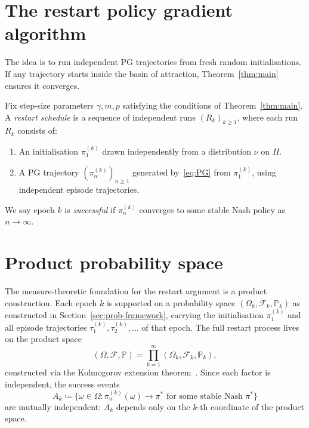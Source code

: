 \documentclass[a4paper,oneside,11pt]{report}
\newcommand{\Prob}{\mathbb{P}}
\newcommand{\calF}{\mathcal{F}}
\numberwithin{theorem}{chapter}
\numberwithin{equation}{chapter}
\begin{document}
\section{The restart policy gradient algorithm}
\label{sec:restart-alg}

The idea is to run independent PG trajectories from fresh random
initialisations. If any trajectory starts inside the basin of
attraction, Theorem~\ref{thm:main} ensures it converges.

\begin{definition}[Restart-PG]
  \label{def:restart-PG}
  Fix step-size parameters $\gamma, m, p$ satisfying the conditions of
  Theorem~\ref{thm:main}. A \emph{restart schedule} is a sequence of
  independent runs $(R_k)_{k \ge 1}$, where each run~$R_k$ consists of:
  \begin{enumerate}
  \item An initialisation $\pi_1^{(k)}$ drawn independently from a
    distribution $\nu$ on $\Pi$.
  \item A PG trajectory $(\pi_n^{(k)})_{n \ge 1}$ generated
    by~\eqref{eq:PG} from $\pi_1^{(k)}$, using independent episode
    trajectories.
  \end{enumerate}
  We say epoch $k$ is \emph{successful} if $\pi_n^{(k)}$ converges to
  some stable Nash policy as $n \to \infty$.
\end{definition}

\section{Product probability space}
\label{sec:product-space}

The measure-theoretic foundation for the restart argument is a product
construction. Each epoch $k$ is supported on a probability space
$(\Omega_k, \calF_k, \Prob_k)$ as constructed in
Section~\ref{sec:prob-framework}, carrying the initialisation
$\pi_1^{(k)}$ and all episode trajectories
$\tau_1^{(k)}, \tau_2^{(k)}, \ldots$ of that epoch. The full restart
process lives on the product space
\begin{equation}
  \label{eq:product-space}
  (\Omega, \calF, \Prob) = \prod_{k=1}^\infty
  (\Omega_k, \calF_k, \Prob_k),
\end{equation}
constructed via the Kolmogorov extension theorem~\cite{durrett2019}.
Since each factor is independent, the success events
\begin{equation}
  \label{eq:success-event}
  A_k \coloneqq \bigl\{\omega \in \Omega :
  \pi_n^{(k)}(\omega) \to \pi^*
  \text{ for some stable Nash } \pi^*\bigr\}
\end{equation}
are mutually independent: $A_k$ depends only on the $k$-th coordinate
of the product space.
\end{document}
